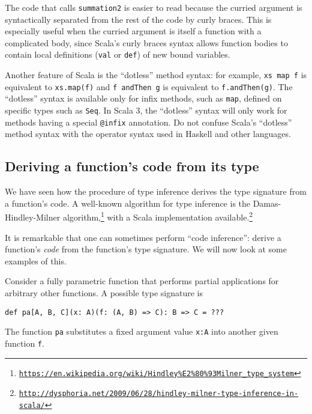 \noindent The code that calls \lstinline!summation2! is easier to
read because the curried argument is syntactically separated from
the rest of the code by curly braces. This is especially useful when
the curried argument is itself a function with a complicated body,
since Scala\textsf{'}s curly braces syntax allows function bodies to contain
local definitions (\lstinline!val! or \lstinline!def!) of new bound
variables.

Another feature of Scala is the \textsf{``}dotless\textsf{''} method syntax: for example,
\lstinline!xs map f! is equivalent to \lstinline!xs.map(f)! and
\lstinline!f andThen g! is equivalent to \lstinline!f.andThen(g)!.
The \textsf{``}dotless\textsf{''} syntax is available only for infix methods, such
as \lstinline!map!, defined on specific types such as \lstinline!Seq!.
In Scala 3, the \textsf{``}dotless\textsf{''} syntax will only work for methods having
a special \lstinline!@infix! annotation. Do not confuse Scala\textsf{'}s \textsf{``}dotless\textsf{''}
method syntax with the operator syntax used in Haskell and other languages.

\subsection{Deriving a function\textsf{'}s code from its type\label{subsec:Deriving-a-function-s-code}}

We have seen how the procedure of type inference
derives the type signature from a function\textsf{'}s code. A well-known algorithm
for type inference is the Damas-Hindley-Milner algorithm,\footnote{\texttt{\href{https://en.wikipedia.org/wiki/Hindley\%E2\%80\%93Milner_type_system}{https://en.wikipedia.org/wiki/Hindley\%E2\%80\%93Milner\_type\_system}}}
with a Scala implementation available.\footnote{\texttt{\href{http://dysphoria.net/2009/06/28/hindley-milner-type-inference-in-scala/}{http://dysphoria.net/2009/06/28/hindley-milner-type-inference-in-scala/}}}

It is remarkable that one can sometimes perform \textsf{``}code
inference\textsf{''}: derive a function\textsf{'}s \emph{code} from the function\textsf{'}s
type signature. We will now look at some examples of this.

Consider a fully parametric function that performs partial applications
for arbitrary other functions. A possible type signature is
\begin{lstlisting}
def pa[A, B, C](x: A)(f: (A, B) => C): B => C = ???
\end{lstlisting}
The function \lstinline!pa! substitutes a fixed argument value \lstinline!x:A!
into another given function \lstinline!f!. 


